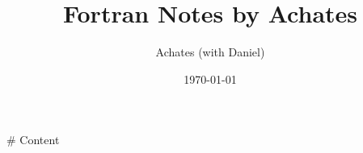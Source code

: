 \documentclass[12pt]{book}
\begin{document}
\frontmatter
\title{Fortran Notes by Achates}
\author{Achates (with Daniel)}
\date{\today}
\maketitle

\tableofcontents

\mainmatter

# Content
	 
	 
\printbibliography
\end{document}
